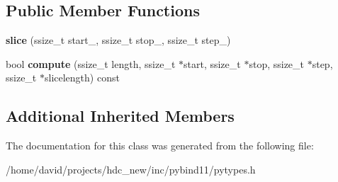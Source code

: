 \subsection*{Public Member Functions}
\begin{DoxyCompactItemize}
\item 
{\bfseries slice} (ssize\+\_\+t start\+\_\+, ssize\+\_\+t stop\+\_\+, ssize\+\_\+t step\+\_\+)\hypertarget{classslice_a4caff82ebcad8f35458f8519aa0a9f77}{}\label{classslice_a4caff82ebcad8f35458f8519aa0a9f77}

\item 
bool {\bfseries compute} (ssize\+\_\+t length, ssize\+\_\+t $\ast$start, ssize\+\_\+t $\ast$stop, ssize\+\_\+t $\ast$step, ssize\+\_\+t $\ast$slicelength) const \hypertarget{classslice_ac9d59399b31007c5d66790c5a5b07083}{}\label{classslice_ac9d59399b31007c5d66790c5a5b07083}

\end{DoxyCompactItemize}
\subsection*{Additional Inherited Members}


The documentation for this class was generated from the following file\+:\begin{DoxyCompactItemize}
\item 
/home/david/projects/hdc\+\_\+new/inc/pybind11/pytypes.\+h\end{DoxyCompactItemize}
